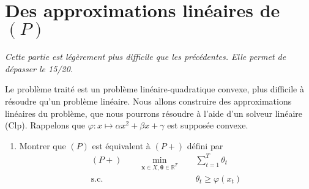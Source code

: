 \documentclass[10pt]{article}
\def\x{\mathbf{x}}
\def\R{\mathbb{R}}
\def\btheta{\boldsymbol{\theta}}
\begin{document}
\section{Des approximations linéaires de $(P)$}

{\em Cette partie est légèrement plus difficile que les précédentes. Elle permet de dépasser le 15/20.}

Le problème traité est un problème linéaire-quadratique convexe, plus difficile à résoudre qu'un problème linéaire. Nous allons construire des approximations linéaires du problème, que nous pourrons résoudre à l'aide d'un solveur linéaire (Clp). Rappelons que $\varphi:x\mapsto \alpha x^2 + \beta x + \gamma$ est supposée convexe.
\begin{enumerate}[resume]
	\item Montrer que $(P)$ est équivalent à $(P+)$ défini par
		\begin{align*}
		(P+) \qquad \min_{\x \in X, \btheta \in \R^T} \quad & \sum_{t=1}^T \theta_t \\
		\mbox{s.c.} \quad & \theta_t \geq \varphi(x_t)
		\end{align*}



\end{enumerate}
\end{document}
